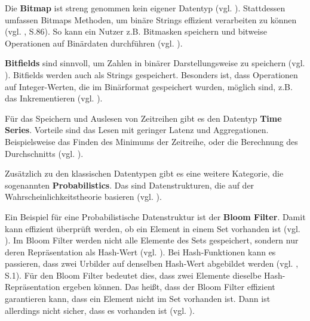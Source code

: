 Die \textbf{Bitmap} ist streng genommen kein eigener Datentyp (vgl. \cite{Redis-Docs-Bitmap}). Stattdessen umfassen Bitmaps Methoden, um binäre Strings effizient verarbeiten zu können (vgl. \cite{nosql}, S.86). So kann ein Nutzer z.B. Bitmasken speichern und bitweise Operationen auf Binärdaten durchführen (vgl. \cite{Redis-Docs-Bitmap}).

\textbf{Bitfields} sind sinnvoll, um Zahlen in binärer Darstellungsweise zu speichern (vgl. \cite{Redis-Docs-Bitfield}). Bitfields werden auch als Strings gespeichert. Besonders ist, dass Operationen auf Integer-Werten, die im Binärformat gespeichert wurden, möglich sind, z.B. das Inkrementieren (vgl. \cite{Redis-Docs-Bitfield}).

Für das Speichern und Auslesen von Zeitreihen gibt es den Datentyp \textbf{Time Series}. Vorteile sind das Lesen mit geringer Latenz und Aggregationen. Beispielsweise das Finden des Minimums der Zeitreihe, oder die Berechnung des Durchschnitts (vgl. \cite{Redis-Docs-TS}).

Zusätzlich zu den klassischen Datentypen gibt es eine weitere Kategorie, die sogenannten \textbf{Probabilistics}. Das sind Datenstrukturen, die auf der Wahrscheinlichkeitstheorie basieren (vgl. \cite{Redis-Docs-Prob}). 

Ein Beispiel für eine Probabilistische Datenstruktur ist der \textbf{Bloom Filter}. Damit kann effizient überprüft werden, ob ein Element in einem Set vorhanden ist (vgl. \cite{Redis-Docs-Bloom}). Im Bloom Filter werden nicht alle Elemente des Sets gespeichert, sondern nur deren Repräsentation als Hash-Wert (vgl. \cite{Redis-Docs-Bloom}). Bei Hash-Funktionen kann es passieren, dass zwei Urbilder auf denselben Hash-Wert abgebildet werden (vgl. \cite{13}, S.1). Für den Bloom Filter bedeutet dies, dass zwei Elemente dieselbe Hash-Repräsentation ergeben können. Das heißt, dass der Bloom Filter effizient garantieren kann, dass ein Element nicht im Set vorhanden ist. Dann ist allerdings nicht sicher, dass es vorhanden ist (vgl. \cite{Redis-Docs-Bloom}).




